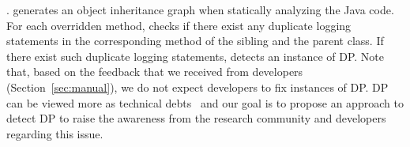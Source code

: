 
\vspace{-0.1cm}
.
\toolS generates an object inheritance graph when statically analyzing the Java code. For each overridden method, \toolS checks if there exist any duplicate logging statements in the corresponding method of the sibling and the parent class. If there exist such duplicate logging statements, \toolS detects an instance of DP. Note that, based on the feedback that we received from developers (Section~\ref{sec:manual}), we do not expect developers to fix instances of DP. DP can be viewed more as technical debts~\cite{Kruchten:2012:TDM:2412381.2412847} and our goal is to propose an approach to detect DP to raise the awareness from the research community and developers regarding this issue.

\vspace{-0.1cm}


